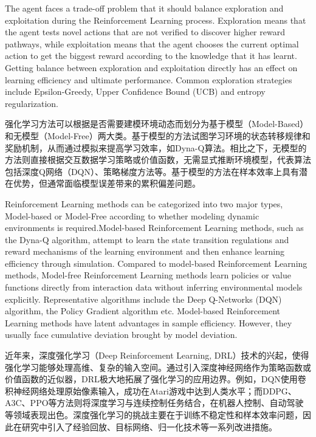 The agent faces a trade-off problem that it should balance exploration and exploitation during the Reinforcement Learning process. Exploration means that the agent tests novel actions that are not verified to discover higher reward pathways, while exploitation means that the agent chooses the current optimal action to get the biggest reward according to the knowledge that it has learnt. Getting balance between exploration and exploitation directly has an effect on learning efficiency and ultimate performance. Common exploration strategies include Epsilon-Greedy\cite{wunder2010classes}, Upper Confidence Bound (UCB)\cite{auer2002finite} and entropy regularization.

强化学习方法可以根据是否需要建模环境动态而划分为基于模型（Model-Based）和无模型（Model-Free）两大类。基于模型的方法试图学习环境的状态转移规律和奖励机制，从而通过模拟来提高学习效率，如Dyna-Q\cite{peng2018deep}算法。相比之下，无模型的方法则直接根据交互数据学习策略或价值函数，无需显式推断环境模型，代表算法包括深度Q网络（DQN）、策略梯度方法等。基于模型的方法在样本效率上具有潜在优势，但通常面临模型误差带来的累积偏差问题。

Reinforcement Learning methods can be categorized into two major types, Model-based or Model-Free according to whether modeling dynamic environments is required.Model-based Reinforcement Learning methods, such as the Dyna-Q algorithm\cite{peng2018deep}, attempt to learn the state transition regulations and reward mechanisms of the learning environment and then enhance learning efficiency through simulation. Compared to model-based Reinforcement Learning methods, Model-free Reinforcement Learning methods learn policies or value functions directly from interaction data without inferring environmental models explicitly. Representative algorithms include the Deep Q-Networks (DQN) algorithm, the Policy Gradient algorithm etc. Model-based Reinforcement Learning methods have latent advantages in sample efficiency. However, they usually face cumulative deviation brought by model deviation.

近年来，深度强化学习\cite{li2019deep}（Deep Reinforcement Learning, DRL）技术的兴起，使得强化学习能够处理高维、复杂的输入空间。通过引入深度神经网络作为策略函数或价值函数的近似器，DRL极大地拓展了强化学习的应用边界。例如，DQN使用卷积神经网络处理原始像素输入，成功在Atari游戏中达到人类水平；而DDPG、A3C、PPO等方法则将深度学习与连续控制任务结合，在机器人控制、自动驾驶等领域表现出色。深度强化学习的挑战主要在于训练不稳定性和样本效率问题，因此在研究中引入了经验回放、目标网络、归一化技术等一系列改进措施。

